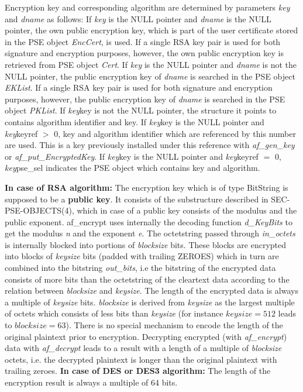 Encryption key and corresponding algorithm are determined by parameters {\em key} and {\em dname} as follows:
\be
\m If {\em key} is the NULL pointer and {\em dname} is the NULL pointer,
   the own public encryption key, which is part of the user certificate stored in the PSE object
   {\em EncCert}, is used.
   If a single RSA key pair is used for both signature and encryption purposes, however, the own public encryption key
   is retrieved from PSE object {\em Cert}.
\m If {\em key} is the NULL pointer and {\em dname} is not the NULL pointer,
   the public encryption key of {\em dname} is searched in the PSE object {\em EKList}.
   If a single RSA key pair is used for both signature and encryption purposes, however, the public encryption key of 
   {\em dname} is searched in the PSE object {\em PKList}.
\m If {\em key}\pf key is not the NULL pointer, the structure it points to
   contains algorithm identifier and key.
\m If {\em key}\pf key is the NULL pointer and {\em key}\pf keyref $>$ 0,
   key and algorithm identifier which are referenced by this number are used. This is a key
   previously installed under this reference with {\em af\_gen\_key} or 
   {\em af\_put\_EncryptedKey}.
\m If {\em key}\pf key is the NULL pointer and {\em key}\pf keyref $=$ 0,
   {\em key}\pf pse\_sel indicates the PSE object which contains key and algorithm.
\ee

{\bf In case of RSA algorithm:}
\be
\m The encryption key which is of type BitString is supposed to be
   a {\bf public key}. It consists of the substructure described in
   SEC-PSE-OBJECTS(4),
   which in case of a public key consists of the
   modulus and the public exponent. af\_encrypt uses internally the
   decoding function {\em d\_KeyBits} to get the modulus {\em n} and the exponent {\em e}.
\m The octetstring passed through {\em in\_octets} is internally blocked into portions of
   {\em blocksize} bits. These blocks are encrypted into blocks of {\em keysize} bits
   (padded with trailing ZEROES) which in turn are combined into the bitstring {\em out\_bits}, i.e
   the bitstring of the encrypted data consists of more bits than the octetstring of the cleartext data
   according to the relation between {\em blocksize} and {\em keysize}.
   The length of the encrypted data is always a multiple of {\em keysize} bits.
   {\em blocksize} is derived from {\em keysize} as the largest multiple of octets which consists of
   less bits than {\em keysize} (for instance $keysize = 512$ leads to $blocksize = 63$).
\m There is no special mechanism to encode the length of the original plaintext prior
   to encryption. Decrypting encrypted (with {\em af\_encrypt}) data with {\em af\_decrypt}
   leads to a result with a length of a multiple of {\em blocksize} octets, i.e. the decrypted
   plaintext is longer than the original plaintext with trailing zeroes.
\ee
{\bf In case of DES or DES3 algorithm:}
   The length of the encryption result is always a multiple of 64 bits.

